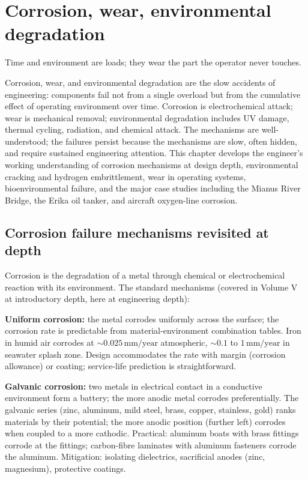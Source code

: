\chapter{Corrosion, wear, environmental degradation}
\label{vol10:ch03}

\epigraph{Time and environment are loads; they wear the part the operator never touches.}{}


\noindent
Corrosion, wear, and environmental degradation are the slow accidents of engineering: components fail not from a single overload but from the cumulative effect of operating environment over time. Corrosion is electrochemical attack; wear is mechanical removal; environmental degradation includes UV damage, thermal cycling, radiation, and chemical attack. The mechanisms are well-understood; the failures persist because the mechanisms are slow, often hidden, and require sustained engineering attention. This chapter develops the engineer's working understanding of corrosion mechanisms at design depth, environmental cracking and hydrogen embrittlement, wear in operating systems, bioenvironmental failure, and the major case studies including the Mianus River Bridge, the Erika oil tanker, and aircraft oxygen-line corrosion.

\section{Corrosion failure mechanisms revisited at depth}

Corrosion is the degradation of a metal through chemical or electrochemical reaction with its environment. The standard mechanisms (covered in Volume V at introductory depth, here at engineering depth):

\textbf{Uniform corrosion:} the metal corrodes uniformly across the surface; the corrosion rate is predictable from material-environment combination tables. Iron in humid air corrodes at $\sim 0.025\,\text{mm/year}$ atmospheric, $\sim 0.1$ to $1\,\text{mm/year}$ in seawater splash zone. Design accommodates the rate with margin (corrosion allowance) or coating; service-life prediction is straightforward.

\textbf{Galvanic corrosion:} two metals in electrical contact in a conductive environment form a battery; the more anodic metal corrodes preferentially. The galvanic series (zinc, aluminum, mild steel, brass, copper, stainless, gold) ranks materials by their potential; the more anodic position (further left) corrodes when coupled to a more cathodic. Practical: aluminum boats with brass fittings corrode at the fittings; carbon-fibre laminates with aluminum fasteners corrode the aluminum. Mitigation: isolating dielectrics, sacrificial anodes (zinc, magnesium), protective coatings.

